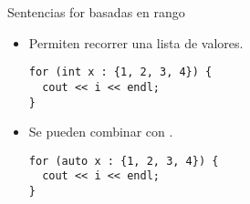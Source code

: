 \begin{frame}[t,fragile]{Sentencias for basadas en rango}
\begin{itemize}
  \item Permiten recorrer una lista de valores.
\begin{lstlisting}
for (int x : {1, 2, 3, 4}) {
  cout << i << endl;
}
\end{lstlisting}
  \item Se pueden combinar con .
\begin{lstlisting}
for (auto x : {1, 2, 3, 4}) {
  cout << i << endl;
}
\end{lstlisting}

\end{itemize}
\end{frame}
